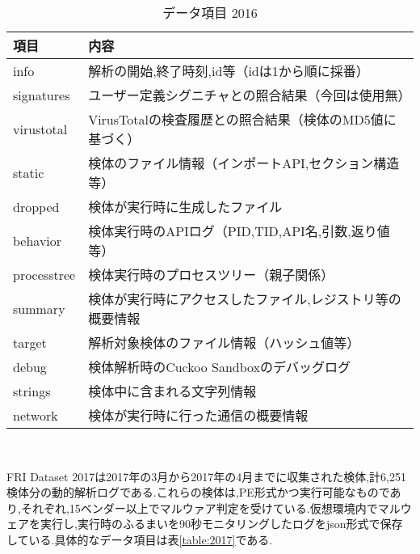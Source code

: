 \documentclass{thesis}
\begin{document}
\begin{table}[H]
\begin{center}
  \caption{データ項目 2016}
\label{table:2016}
\begin{tabular}{|l|l|} \hline
項目 & 内容  \\ 
\hline \hline
info & 解析の開始,終了時刻,id等（idは1から順に採番） \\ \hline
signatures &ユーザー定義シグニチャとの照合結果（今回は使用無）  \\ \hline
virustotal &VirusTotalの検査履歴との照合結果（検体のMD5値に基づく）  \\ \hline
 static& 検体のファイル情報（インポートAPI,セクション構造等） \\ \hline
 dropped& 検体が実行時に生成したファイル \\ \hline
behavior &検体実行時のAPIログ（PID,TID,API名,引数,返り値等）  \\ \hline
processtree  &検体実行時のプロセスツリー（親子関係）  \\ \hline
summary &検体が実行時にアクセスしたファイル,レジストリ等の概要情報  \\ \hline
 target& 解析対象検体のファイル情報（ハッシュ値等） \\ \hline
debug & 検体解析時のCuckoo Sandboxのデバッグログ \\ \hline
strings  & 検体中に含まれる文字列情報 \\ \hline
network & 検体が実行時に行った通信の概要情報 \\ \hline
\end{tabular} 　
\end{center}
\end{table}
FRI Dataset 2017は2017年の3月から2017年の4月までに収集された検体,計6,251検体分の動的解析ログである.これらの検体は,PE形式かつ実行可能なものであり,それぞれ,15ベンダー以上でマルウァア判定を受けている.仮想環境内でマルウェアを実行し,実行時のふるまいを90秒モニタリングしたログをjson形式で保存している.具体的なデータ項目は表\ref{table:2017}\cite{2017}である.
\end{document}
